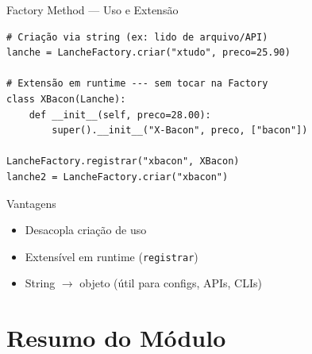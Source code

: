 \documentclass[aspectratio=169]{beamer}
\begin{document}
\begin{frame}[fragile,shrink=5]{Factory Method --- Uso e Extensão}
\begin{lstlisting}
# Criação via string (ex: lido de arquivo/API)
lanche = LancheFactory.criar("xtudo", preco=25.90)

# Extensão em runtime --- sem tocar na Factory
class XBacon(Lanche):
    def __init__(self, preco=28.00):
        super().__init__("X-Bacon", preco, ["bacon"])

LancheFactory.registrar("xbacon", XBacon)
lanche2 = LancheFactory.criar("xbacon")
\end{lstlisting}

\begin{exampleblock}{Vantagens}
\begin{itemize}
  \item Desacopla criação de uso
  \item Extensível em runtime (\texttt{registrar})
  \item String $\to$ objeto (útil para configs, APIs, CLIs)
\end{itemize}
\end{exampleblock}
\end{frame}

\section{Resumo do Módulo}
\end{document}
